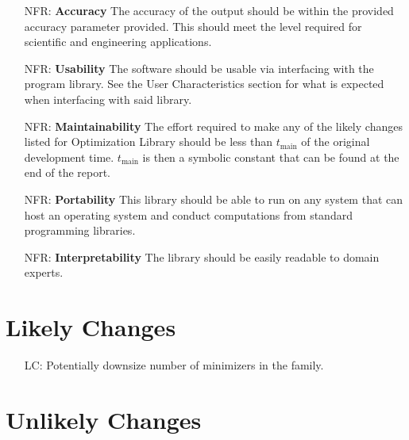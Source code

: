 \documentclass[12pt]{article}
\newcounter{nfrnum} %
\newcounter{lcnum} %
\begin{document}
\noindent \begin{itemize}

\item[NFR\refstepcounter{nfrnum}\thenfrnum \label{NFR_Accuracy}:]
  \textbf{Accuracy} The accuracy of the output should be within the provided accuracy parameter provided. This should meet the level required for scientific and engineering applications. 
\item[NFR\refstepcounter{nfrnum}\thenfrnum \label{NFR_Usability}:] \textbf{Usability}
  The software should be usable via interfacing with the program library. See the User Characteristics section for what is expected when interfacing with said library. 

\item[NFR\refstepcounter{nfrnum}\thenfrnum \label{NFR_Maintainability}:]
  \textbf{Maintainability} The effort required to make any of the likely
    changes listed for Optimization Library should be less than $t_{\text{main}}$ of the original
    development time. $t_{\text{main}}$ is then a symbolic constant that can be found at the end of the report.

\item[NFR\refstepcounter{nfrnum}\thenfrnum \label{NFR_Portability}:]
  \textbf{Portability} This library should be able to run on any system that can host an operating system and conduct computations from standard programming libraries.

\item[NFR\refstepcounter{nfrnum}\thenfrnum \label{NFR_Interpretability}:]
  \textbf{Interpretability} The library should be easily readable to domain experts.

\end{itemize}



\section{Likely Changes}    

\noindent \begin{itemize}

\item[LC\refstepcounter{lcnum}\thelcnum\label{LC_likely1}:] Potentially downsize number of minimizers in the family. 

\end{itemize}

\section{Unlikely Changes}    
\end{document}
